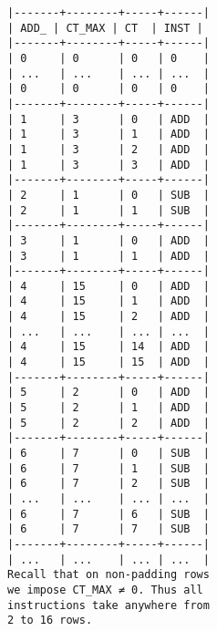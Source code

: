 \documentclass[varwidth=\maxdimen,margin=0.5cm,multi={verbatim}]{standalone}
\begin{document}
\begin{verbatim}
|-------+--------+-----+------|
| ADD_ | CT_MAX | CT  | INST |
|-------+--------+-----+------|
| 0     | 0      | 0   | 0    |
| ...   | ...    | ... | ...  |
| 0     | 0      | 0   | 0    |
|-------+--------+-----+------|
| 1     | 3      | 0   | ADD  |
| 1     | 3      | 1   | ADD  |
| 1     | 3      | 2   | ADD  |
| 1     | 3      | 3   | ADD  |
|-------+--------+-----+------|
| 2     | 1      | 0   | SUB  |
| 2     | 1      | 1   | SUB  |
|-------+--------+-----+------|
| 3     | 1      | 0   | ADD  |
| 3     | 1      | 1   | ADD  |
|-------+--------+-----+------|
| 4     | 15     | 0   | ADD  |
| 4     | 15     | 1   | ADD  |
| 4     | 15     | 2   | ADD  |
| ...   | ...    | ... | ...  |
| 4     | 15     | 14  | ADD  |
| 4     | 15     | 15  | ADD  |
|-------+--------+-----+------|
| 5     | 2      | 0   | ADD  |
| 5     | 2      | 1   | ADD  |
| 5     | 2      | 2   | ADD  |
|-------+--------+-----+------|
| 6     | 7      | 0   | SUB  |
| 6     | 7      | 1   | SUB  |
| 6     | 7      | 2   | SUB  |
| ...   | ...    | ... | ...  |
| 6     | 7      | 6   | SUB  |
| 6     | 7      | 7   | SUB  |
|-------+--------+-----+------|
| ...   | ...    | ... | ...  |
Recall that on non-padding rows
we impose CT_MAX ≠ 0. Thus all
instructions take anywhere from
2 to 16 rows.
\end{verbatim}
\end{document}
